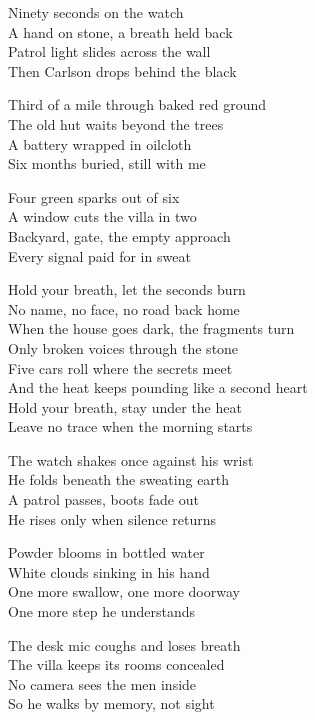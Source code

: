 \begin{lyrics}
Ninety seconds on the watch\\
A hand on stone, a breath held back\\
Patrol light slides across the wall\\
Then Carlson drops behind the black

Third of a mile through baked red ground\\
The old hut waits beyond the trees\\
A battery wrapped in oilcloth\\
Six months buried, still with me

Four green sparks out of six\\
A window cuts the villa in two\\
Backyard, gate, the empty approach\\
Every signal paid for in sweat

Hold your breath, let the seconds burn\\
No name, no face, no road back home\\
When the house goes dark, the fragments turn\\
Only broken voices through the stone\\
Five cars roll where the secrets meet\\
And the heat keeps pounding like a second heart\\
Hold your breath, stay under the heat\\
Leave no trace when the morning starts

The watch shakes once against his wrist\\
He folds beneath the sweating earth\\
A patrol passes, boots fade out\\
He rises only when silence returns

Powder blooms in bottled water\\
White clouds sinking in his hand\\
One more swallow, one more doorway\\
One more step he understands

The desk mic coughs and loses breath\\
The villa keeps its rooms concealed\\
No camera sees the men inside\\
So he walks by memory, not sight


\end{lyrics}

